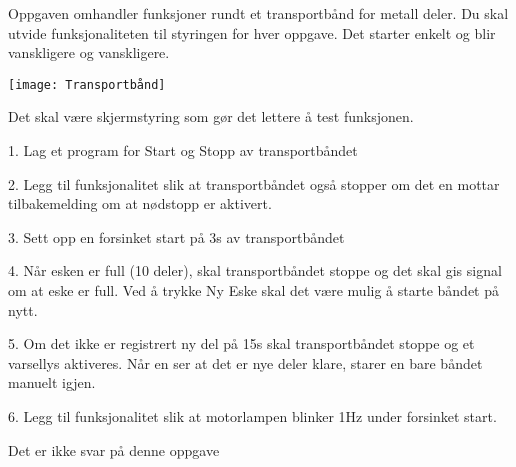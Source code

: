 


Oppgaven omhandler funksjoner rundt et transportbånd for metall deler.
Du skal utvide funksjonaliteten til styringen for hver oppgave. Det
starter enkelt og blir vanskligere og vanskligere. 

\texttt{[image: Transportbånd]}

Det skal være skjermstyring som gør det lettere å test funksjonen. 

1. Lag et program for Start og Stopp av transportbåndet 

2. Legg til funksjonalitet slik at transportbåndet også stopper om
det en mottar tilbakemelding om at nødstopp er aktivert. 

3. Sett opp en forsinket start på 3s av transportbåndet 

4. Når esken er full (10 deler), skal transportbåndet stoppe og det
skal gis signal om at eske er full. Ved å trykke Ny Eske skal det
være mulig å starte båndet på nytt. 

5. Om det ikke er registrert ny del på 15s skal transportbåndet stoppe
og et varsellys aktiveres. Når en ser at det er nye deler klare, starer
en bare båndet manuelt igjen. 

6. Legg til funksjonalitet slik at motorlampen blinker 1Hz under forsinket
start. 

\vskip 10pt





Det er ikke svar på denne oppgave












